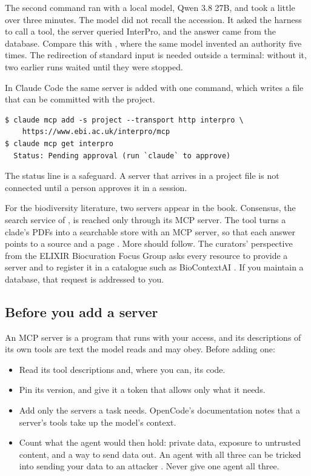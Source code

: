 \documentclass[11pt,a4paper]{article}
\begin{document}
The second command ran with a local model, Qwen 3.8 27B, and took a little
over three minutes. The model did not recall the accession. It asked the
harness to call a tool, the server queried InterPro, and the answer came
from the database. Compare this with , where the same model
invented an authority five times. The redirection of standard input is
needed outside a terminal: without it, two earlier runs waited until they
were stopped.

In Claude Code the same server is added with one command, which writes a file
that can be committed with the project.

\begin{lstlisting}[style=shell,caption={The same server in Claude Code 2.1.322}]
$ claude mcp add -s project --transport http interpro \
    https://www.ebi.ac.uk/interpro/mcp
$ claude mcp get interpro
  Status: Pending approval (run `claude` to approve)
\end{lstlisting}



The status line is a safeguard. A server that arrives in a project file is
not connected until a person approves it in a session.

For the biodiversity literature, two servers appear in the book. Consensus,
the search service of \Cref{sec:assistant}, is reached only through its MCP
server. The \code{corpus} tool turns a clade's PDFs into a searchable store
with an MCP server, so that each answer points to a source and a page
\parencite{church2026corpus}. More should follow. The curators' perspective
from the ELIXIR Biocuration Focus Group asks every resource to provide a
server and to register it in a catalogue such as BioContextAI
\parencite{pombase2026curation}. If you maintain a database, that request is
addressed to you.

\subsection*{Before you add a server}

An MCP server is a program that runs with your access, and its descriptions
of its own tools are text the model reads and may obey. Before adding one:

\begin{itemize}
  \item Read its tool descriptions and, where you can, its code.
  \item Pin its version, and give it a token that allows only what it needs.
  \item Add only the servers a task needs. OpenCode's documentation notes
    that a server's tools take up the model's context.
  \item Count what the agent would then hold: private data, exposure to
    untrusted content, and a way to send data out. An agent with all three
    can be tricked into sending your data to an attacker
    \parencite{willison2025trifecta}. Never give one agent all three.
\end{itemize}
\end{document}
